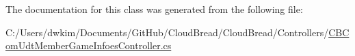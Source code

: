 The documentation for this class was generated from the following file\+:\begin{DoxyCompactItemize}
\item 
C\+:/\+Users/dwkim/\+Documents/\+Git\+Hub/\+Cloud\+Bread/\+Cloud\+Bread/\+Controllers/\hyperlink{_c_b_com_udt_member_game_infoes_controller_8cs}{C\+B\+Com\+Udt\+Member\+Game\+Infoes\+Controller.\+cs}\end{DoxyCompactItemize}
